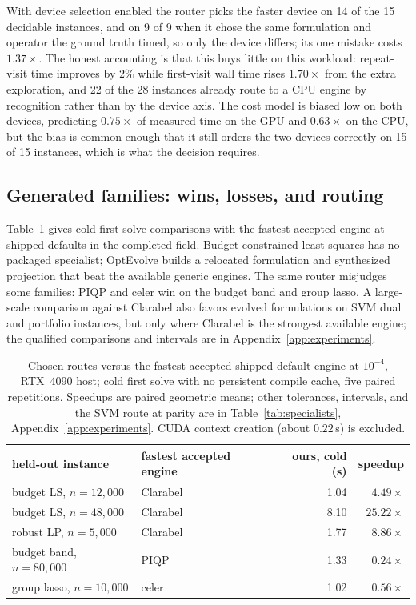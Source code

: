 With device selection enabled the router picks the faster device on 14 of the 15
decidable instances, and on 9 of 9 when it chose the same formulation and
operator the ground truth timed, so only the device differs; its one mistake
costs $1.37\times$. The honest accounting is that this buys little on this
workload: repeat-visit time improves by $2\%$ while first-visit wall time rises
$1.70\times$ from the extra exploration, and 22 of the 28 instances already
route to a CPU engine by recognition rather than by the device axis. The cost
model is biased low on both devices, predicting $0.75\times$ of measured time on
the GPU and $0.63\times$ on the CPU, but the bias is common enough that it still
orders the two devices correctly on 15 of 15 instances, which is what the
decision requires.


\subsection{Generated families: wins, losses, and routing}
\label{app:generated}
\label{sec:exp:specialists}
\label{sec:exp:general}
Table~\ref{tab:headline} gives cold first-solve comparisons with the fastest accepted engine at shipped defaults in the completed field. Budget-constrained least squares has no packaged specialist; OptEvolve builds a relocated formulation and synthesized projection that beat the available generic engines. The same router misjudges some families: PIQP and celer win on the budget band and group lasso. A large-scale comparison against Clarabel also favors evolved formulations on SVM dual and portfolio instances, but only where Clarabel is the strongest available engine; the qualified comparisons and intervals are in Appendix~\ref{app:experiments}.

\begin{table}[H]
\centering\small
\begin{tabular}{llrr}
\toprule
held-out instance & fastest accepted engine & ours, cold (s) & speedup \\
\midrule
budget LS, $n=12{,}000$ & Clarabel & 1.04 & $4.49\times$ \\
budget LS, $n=48{,}000$ & Clarabel & 8.10 & $25.22\times$ \\
robust LP, $n=5{,}000$ & Clarabel & 1.77 & $8.86\times$ \\
budget band, $n=80{,}000$ & PIQP & 1.33 & $0.24\times$ \\
group lasso, $n=10{,}000$ & celer & 1.02 & $0.56\times$ \\
\bottomrule
\end{tabular}
\caption{Chosen routes versus the fastest accepted shipped-default engine at $10^{-4}$, RTX~4090 host; cold first solve with no persistent compile cache, five paired repetitions. Speedups are paired geometric means; other tolerances, intervals, and the SVM route at parity are in Table~\ref{tab:specialists}, Appendix~\ref{app:experiments}. CUDA context creation (about $0.22$\,s) is excluded.}
\label{tab:headline}
\end{table}

